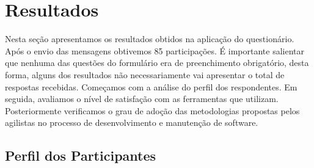 





\section{Resultados}\label{sec:analise_dados}

Nesta seção apresentamos os resultados obtidos na aplicação do questionário.
Após o envio das mensagens obtivemos 85 participações. É importante salientar
que nenhuma das questões do formulário era de preenchimento obrigatório, desta
forma, alguns dos resultados não necessariamente vai apresentar o total de
respostas recebidas. Começamos com a análise do perfil dos respondentes. Em
seguida, avaliamos o nível de satisfação com as ferramentas que utilizam.
Posteriormente verificamos o grau de adoção das metodologias propostas pelos
agilistas no processo de desenvolvimento e manutenção de software.

\subsection{Perfil dos Participantes}\label{sub:pesquisa_prof_perfil_dos_participantes}

